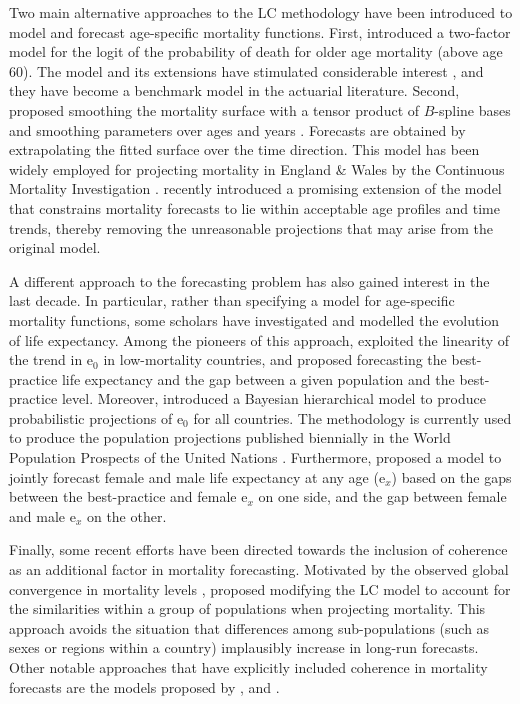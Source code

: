 \documentclass[Thesis]{subfiles}
\begin{document}
Two main alternative approaches to the LC methodology have been introduced to model and forecast age-specific mortality functions. First, \cite{cairns2006two} introduced a two-factor model for the logit of the probability of death for older age mortality (above age 60). The model and its extensions have stimulated considerable interest \cite[see, e.g.,][]{cairns2009quantitative,cairns2011mortality,dowd2010backtesting,dowd2010evaluating}, and they have become a benchmark model in the actuarial literature. Second, \cite{currie2004smoothing} proposed smoothing the mortality surface with a tensor product of $B$-spline bases and smoothing parameters over ages and years \citep{eilers1996flexible}. Forecasts are obtained by extrapolating the fitted surface over the time direction. This model has been widely employed for projecting mortality in England \& Wales by the Continuous Mortality Investigation \cite[see, e.g.,][]{cmi2007stochastic}. \cite{camarda2019smooth} recently introduced a promising extension of the model that constrains mortality forecasts to lie within acceptable age profiles and time trends, thereby removing the unreasonable projections that may arise from the original model. 

A different approach to the forecasting problem has also gained interest in the last decade. In particular, rather than specifying a model for age-specific mortality functions, some scholars have investigated and modelled the evolution of life expectancy. Among the pioneers of this approach, \cite{torri2012forecasting} exploited the linearity of the trend in $\mathrm{e}_0$ in low-mortality countries, and proposed forecasting the best-practice life expectancy and the gap between a given population and the best-practice level. Moreover, \cite{raftery2013bayesian} introduced a Bayesian hierarchical model to produce probabilistic projections of $\mathrm{e}_0$ for all countries. The methodology is currently used to produce the population projections published biennially in the World Population Prospects of the United Nations \citep{raftery2014bayesian}. Furthermore, \cite{pascariu2018double} proposed a model to jointly forecast female and male life expectancy at any age ($\mathrm{e}_x$) based on the gaps between the best-practice and female $\mathrm{e}_x$ on one side, and the gap between female and male $\mathrm{e}_x$ on the other. 

Finally, some recent efforts have been directed towards the inclusion of coherence as an additional factor in mortality forecasting. Motivated by the observed global convergence in mortality levels \citep{wilson2001scale}, \cite{li2005coherent} proposed modifying the LC model to account for the similarities within a group of populations when projecting mortality. This approach avoids the situation that differences among sub-populations (such as sexes or regions within a country) implausibly increase in long-run forecasts. Other notable approaches that have explicitly included coherence in mortality forecasts are the models proposed by \cite{hyndman2013coherent}, \cite{janssen2013smoking} and \cite{bergeron2017coherent,bergeron2018modeling}.
\end{document}
